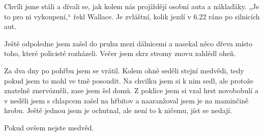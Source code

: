 Chvíli jsme stáli a dívali se, jak kolem nás projíždějí osobní auta a náklaďáky. „Je to pro ni vykoupení,“ řekl Wallace. Je zvláštní, kolik jezdí v 6.22 ráno po silnicích aut.

\bigskip

Ještě odpoledne jsem zašel do pruhu mezi dálnicemi a nasekal něco dřeva místo toho, které policisté rozházeli. Večer jsem skrz stromy znovu zahlédl oheň.

Za dva dny po pohřbu jsem se vrátil. Kolem ohně seděli stejní medvědi, tedy pokud jsem to mohl ve tmě posoudit. Na chvilku jsem si k nim sedl, ale protože znatelně znervózněli, zase jsem šel domů. Z poklice jsem si vzal hrst novobobulí a v neděli jsem s chlapcem zašel na hřbitov a naaranžoval jsem je na maminčině hrobu. Ještě jednou jsem je ochutnal, ale není to k ničemu, jíst se nedají.

Pokud ovšem nejste medvěd.

